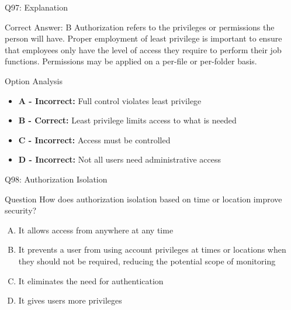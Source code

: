 \documentclass{beamer}
\begin{document}
	\begin{frame}{Q97: Explanation}
		\begin{block}{Correct Answer: B}
			Authorization refers to the privileges or permissions the person will have. Proper employment of least privilege is important to ensure that employees only have the level of access they require to perform their job functions. Permissions may be applied on a per-file or per-folder basis.
		\end{block}
		\begin{block}{Option Analysis}
			\begin{itemize}
				\item \textbf{A - Incorrect:} Full control violates least privilege
				\item \textbf{B - Correct:} Least privilege limits access to what is needed
				\item \textbf{C - Incorrect:} Access must be controlled
				\item \textbf{D - Incorrect:} Not all users need administrative access
			\end{itemize}
		\end{block}
	\end{frame}
	
	\begin{frame}{Q98: Authorization Isolation}
		\begin{block}{Question}
			How does authorization isolation based on time or location improve security?
		\end{block}
		\begin{enumerate}[(A)]
			\item It allows access from anywhere at any time
			\item It prevents a user from using account privileges at times or locations when they should not be required, reducing the potential scope of monitoring
			\item It eliminates the need for authentication
			\item It gives users more privileges
		\end{enumerate}
	\end{frame}
	
\end{document}
